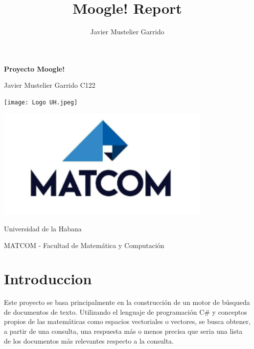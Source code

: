 \documentclass[10pt]{article}
\title{Moogle! Report}
\author{Javier Mustelier Garrido}
\begin{document}
\addtocounter{page}{-2} 

\begingroup %

\begin{center}
	\thispagestyle{empty}
	
	\fontsize{35}{0}
	\bfseries Proyecto Moogle!

	\vspace{1cm}
	
	\Large Javier Mustelier Garrido C122 

	\vspace{2cm}

	\texttt{[image: Logo UH.jpeg]}

	\vspace{2cm}

	\includegraphics[width=300pt]{matcom.png}

	\vspace{2cm}

	Universidad de la Habana 
	
	\large{ MATCOM - Facultad de Matemática y Computación }
	
\end{center}
\endgroup %

\begin{center} %
	\tableofcontents
	\thispagestyle{empty}
	\clearpage
\end{center} 

\begingroup %

\section{Introduccion}

Este proyecto se basa principalmente en la construcción de un motor de búsqueda de documentos de texto. Utilizando el lenguaje de programación C\# y conceptos propios de las matemáticas como espacios vectoriales o vectores, se busca obtener, a partir de una consulta, una respuesta más o menos precisa que seria una lista de los documentos más relevantes respecto a la consulta.
\end{document}
